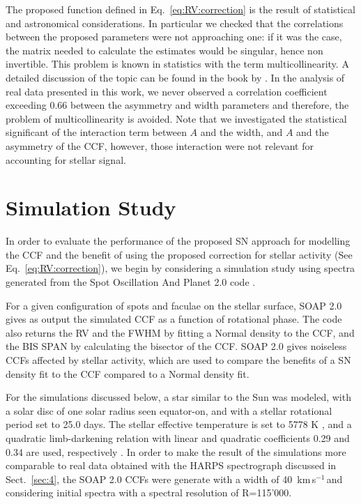 \documentclass{aa}
\def\kms{\hbox{\,km\,s$^{-1}$}}       %
\newcommand{\jessi}[1]{{\color{Purple}[[\textbf{Jessi: }#1]]}}
\begin{document}
The proposed function defined in Eq.~\ref{eq:RV:correction} is the result of statistical and astronomical considerations. In particular we checked that the correlations between the proposed parameters were not approaching one: if it was the case, the matrix needed to calculate the estimates would be singular, hence non invertible. This problem is known in statistics with the term multicollinearity. A detailed discussion of the topic can be found in the book by \citet{belsley1991}. In the analysis of real data presented in this work, we never observed a correlation coefficient exceeding $0.66$ between the asymmetry and width parameters and therefore, the problem of multicollinearity is avoided. Note that we investigated the statistical significant of the interaction term between $A$ and the width, and $A$ and the asymmetry of the CCF, however, those interaction were not relevant for accounting for stellar signal.

\section{Simulation Study} \label{sec:soap}
In order to evaluate the performance of the proposed SN approach for modelling the CCF and the benefit of using the proposed correction for stellar activity (See Eq.~\ref{eq:RV:correction}), we begin by considering a simulation study using spectra generated from the Spot Oscillation And Planet 2.0 code \citep[SOAP 2.0,][]{Dumusque-2014b}.

For a given configuration of spots and faculae on the stellar surface, SOAP 2.0 gives as output the simulated CCF as a function of rotational phase. The code also returns the RV and the FWHM by fitting a Normal density to the CCF, and the BIS SPAN by calculating the bisector of the CCF. SOAP 2.0 gives noiseless CCFs affected by stellar activity, which are used to compare the benefits of a SN density fit to the CCF compared to a Normal density fit.

For the simulations discussed below, a star similar to the Sun was modeled, with a solar disc of one solar radius seen equator-on, and with a stellar rotational period set to 25.0 days.
The stellar effective temperature is set to 5778 K
, and a quadratic limb-darkening relation with linear and quadratic coefficients 0.29 and 0.34 are used, respectively \citep[][]{Oshagh-2013a, Claret-2011}.
In order to make the result of the simulations more comparable to real data obtained with the HARPS spectrograph discussed in Sect.~\ref{sec:4}, the SOAP 2.0 CCFs were generate with a width of 40 \kms\,and considering initial spectra with a spectral resolution of R=115'000.
\end{document}
